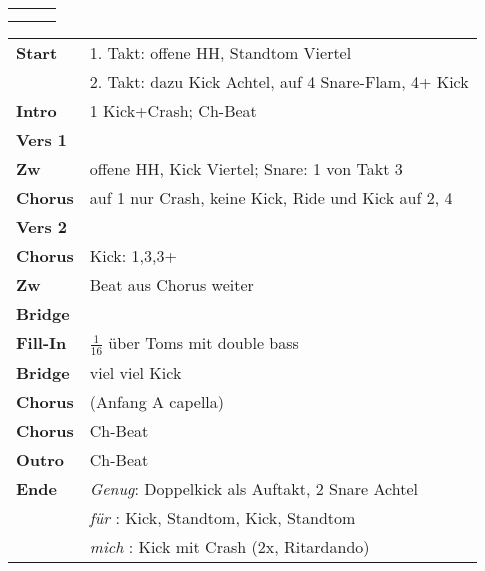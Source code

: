 

\begin{tabular}{p{0.6cm}p{12cm}p{1.4cm}}
	\rowcolor{cyan} \myRow{\thesongnumber} & \myRow{Priorität} & \myRow{160} \\
	                                       &                   &             \\
\end{tabular}

\begin{tabular}{p{1.6cm}l}
	\textbf{Start}   & 1. Takt: offene HH, Standtom Viertel                   \\
	                 & 2. Takt: dazu Kick Achtel, auf 4 Snare-Flam, 4+ Kick   \\
	\textbf{Intro}   & 1 Kick+Crash; Ch-Beat                                  \\
	\textbf{Vers 1}  &                                                        \\
	\textbf{Zw}      & offene HH, Kick Viertel; Snare: 1 von Takt 3           \\
	\textbf{Chorus}  & auf 1 nur Crash, keine Kick, Ride und Kick auf 2, 4    \\
	\textbf{Vers 2}  &                                                        \\
	\textbf{Chorus}  & Kick: 1,3,3+                                           \\
	\textbf{Zw}      & Beat aus Chorus weiter                                 \\
	\textbf{Bridge}  &                                                        \\
	\textbf{Fill-In} & $\frac{1}{16}$ über Toms mit double bass               \\
	\textbf{Bridge}  & viel viel Kick                                         \\
	\textbf{Chorus}  & (Anfang A capella)                                     \\
	\textbf{Chorus}  & Ch-Beat                                                \\
	\textbf{Outro}   & Ch-Beat                                                \\
	\textbf{Ende}    & \textit{Genug}: Doppelkick als Auftakt, 2 Snare Achtel \\
	                 & \textit{für  }: Kick, Standtom, Kick, Standtom         \\
	                 & \textit{mich }: Kick mit Crash (2x, Ritardando)        \\
\end{tabular}
